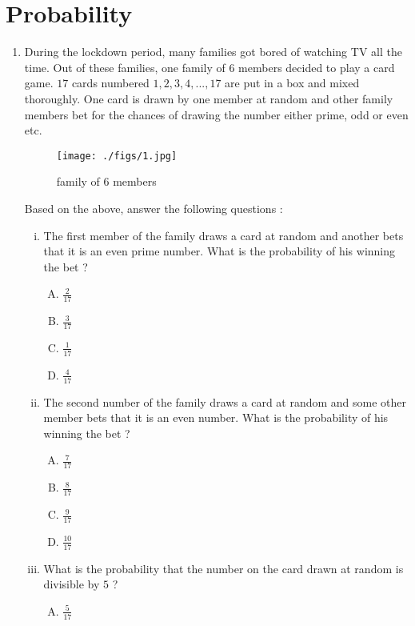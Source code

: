 \documentclass{article}
\begin{document}
\section*{\center Probability}
\begin{enumerate}
    \item During the lockdown period, many families got bored of watching TV all the time. Out of these families, one family of $6$ members decided to play a card game. $17$ cards numbered $1,2,3,4, ..., 17$ are put in a box and mixed thoroughly. One card is drawn by one member at random and other family members bet for the chances of drawing the number either prime, odd or even etc.
 \begin{figure}[h]
    \texttt{[image: ./figs/1.jpg]}
    \caption{family of 6 members}
    \label{fig:cards drawn by family}
\end{figure}
    Based on the above, answer the following questions :
    \begin{enumerate}[(i)]
        \item The first member of the family draws a card at random and another  bets that it is an even prime number. What is the probability of his winning the bet ?
        \begin{enumerate}[(A)]
             \item $\frac{2}{17}$
             \item $\frac{3}{17}$
             \item $\frac{1}{17}$
             \item $\frac{4}{17}$
        \end{enumerate}
        \item The second number of the family draws a card at random and some other member bets that it is an even number. What is the probability of his winning the bet ?
        \begin{enumerate}[(A)]
             \item $\frac{7}{17}$
             \item $\frac{8}{17}$
             \item $\frac{9}{17}$
             \item $\frac{10}{17}$
        \end{enumerate}
        \item What is the probability that the number on the card drawn at random is divisible by $5$ ?
        \begin{enumerate}[(A)]
             \item $\frac{5}{17}$

\end{enumerate}
\end{enumerate}
\end{enumerate}
\end{document}
